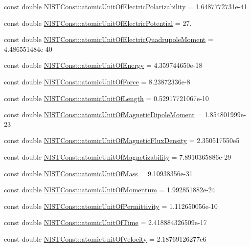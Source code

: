 \begin{DoxyCompactItemize}
\item 
const double \mbox{\hyperlink{group___n_i_s_t_const-_atomic_unit_ga5809393ec8d30cbb7e0c7a2f168e48ec}{N\+I\+S\+T\+Const\+::atomic\+Unit\+Of\+Electric\+Polarizability}} = 1.\+6487772731e-\/41
\item 
const double \mbox{\hyperlink{group___n_i_s_t_const-_atomic_unit_ga139c6486b1899658838d403380fc229a}{N\+I\+S\+T\+Const\+::atomic\+Unit\+Of\+Electric\+Potential}} = 27.
\item 
const double \mbox{\hyperlink{group___n_i_s_t_const-_atomic_unit_gae7f2ec900567291168cdf7351248074d}{N\+I\+S\+T\+Const\+::atomic\+Unit\+Of\+Electric\+Quadrupole\+Moment}} = 4.\+486551484e-\/40
\item 
const double \mbox{\hyperlink{group___n_i_s_t_const-_atomic_unit_gadc3fdb8850235efe9e73bcf733fdbfe8}{N\+I\+S\+T\+Const\+::atomic\+Unit\+Of\+Energy}} = 4.\+359744650e-\/18
\item 
const double \mbox{\hyperlink{group___n_i_s_t_const-_atomic_unit_ga2788fede3c8dab37305c9510cbb95001}{N\+I\+S\+T\+Const\+::atomic\+Unit\+Of\+Force}} = 8.\+23872336e-\/8
\item 
const double \mbox{\hyperlink{group___n_i_s_t_const-_atomic_unit_ga246e4c3edecdd5aa1d5d208fc02a4636}{N\+I\+S\+T\+Const\+::atomic\+Unit\+Of\+Length}} = 0.\+52917721067e-\/10
\item 
const double \mbox{\hyperlink{group___n_i_s_t_const-_atomic_unit_ga56b280760cc855923e548c6676d90916}{N\+I\+S\+T\+Const\+::atomic\+Unit\+Of\+Magnetic\+Dipole\+Moment}} = 1.\+854801999e-\/23
\item 
const double \mbox{\hyperlink{group___n_i_s_t_const-_atomic_unit_gaaf4c9b5c25a5e1bee2f65c8a82e0ee63}{N\+I\+S\+T\+Const\+::atomic\+Unit\+Of\+Magnetic\+Flux\+Density}} = 2.\+350517550e5
\item 
const double \mbox{\hyperlink{group___n_i_s_t_const-_atomic_unit_ga9c2b29b9a46e8dfd78837ef0c8a16bec}{N\+I\+S\+T\+Const\+::atomic\+Unit\+Of\+Magnetizability}} = 7.\+8910365886e-\/29
\item 
const double \mbox{\hyperlink{group___n_i_s_t_const-_atomic_unit_ga61a2da51489f7bb8965e9e4747db34a7}{N\+I\+S\+T\+Const\+::atomic\+Unit\+Of\+Mass}} = 9.\+10938356e-\/31
\item 
const double \mbox{\hyperlink{group___n_i_s_t_const-_atomic_unit_gae70262618755d765a1de59f471b56040}{N\+I\+S\+T\+Const\+::atomic\+Unit\+Of\+Momentum}} = 1.\+992851882e-\/24
\item 
const double \mbox{\hyperlink{group___n_i_s_t_const-_atomic_unit_ga0b7518cf6058bb899c64b32b43bda955}{N\+I\+S\+T\+Const\+::atomic\+Unit\+Of\+Permittivity}} = 1.\+112650056e-\/10
\item 
const double \mbox{\hyperlink{group___n_i_s_t_const-_atomic_unit_ga6181f64b8320afb6ecacc9c7f7e27afa}{N\+I\+S\+T\+Const\+::atomic\+Unit\+Of\+Time}} = 2.\+418884326509e-\/17
\item 
const double \mbox{\hyperlink{group___n_i_s_t_const-_atomic_unit_gaf22e630a5412176c4d94dbc8b1e36f70}{N\+I\+S\+T\+Const\+::atomic\+Unit\+Of\+Velocity}} = 2.\+18769126277e6
\end{DoxyCompactItemize}


